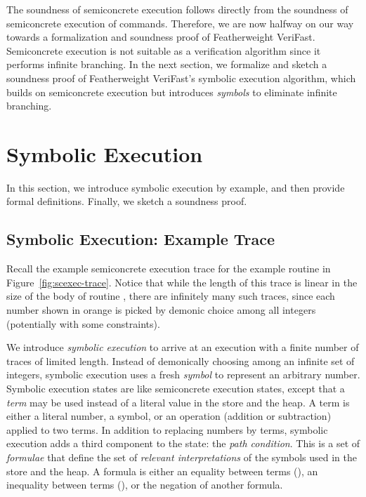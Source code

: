 \documentclass{CSML}
\theoremstyle{definition}\newtheorem{notation}[thm]{Notation}
\theoremstyle{plain}\newtheorem{satz}[thm]{Satz}
\begin{document}
The soundness of semiconcrete execution follows directly from the 
soundness of semiconcrete execution of commands.
Therefore, we are now halfway on our way towards a 
formalization and soundness proof of Featherweight VeriFast. 
Semiconcrete execution is not suitable as a verification 
algorithm since it performs infinite branching. In the next 
section, we formalize and sketch a soundness proof of 
Featherweight VeriFast's symbolic execution algorithm, which 
builds on semiconcrete execution but introduces \emph{symbols} 
to eliminate infinite branching.

\section{Symbolic Execution}\label{sec:symexec}

In this section, we introduce symbolic execution by example, and then provide formal definitions. Finally, we sketch a soundness proof.

\subsection{Symbolic Execution: Example Trace}

Recall the example semiconcrete execution trace for 
the example routine  in Figure~\ref{fig:scexec-trace}.
Notice that while the length 
of this trace is linear in the size of the body of routine 
, there are infinitely many such traces, since 
each number shown in orange is picked by demonic choice among 
all integers (potentially with some constraints).

We introduce \emph{symbolic execution} to arrive at an 
execution with a finite number of traces of limited length. 
Instead of demonically choosing among an infinite set of 
integers, symbolic execution uses a fresh \emph{symbol} to 
represent an arbitrary number. Symbolic execution states are 
like semiconcrete execution states, except that a \emph{term} 
may be used instead of a literal value in the store and the 
heap. A term is either a literal number, a symbol, or an 
operation (addition or subtraction) applied to two terms. In 
addition to replacing numbers by terms, symbolic execution adds 
a third component to the state: the \emph{path condition}. This 
is a set of \emph{formulae} that define the set of \emph{relevant
interpretations} of the symbols used in the store and the heap. 
A formula is either an equality between terms (), an 
inequality between terms (), or the negation of another 
formula.
\end{document}
